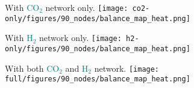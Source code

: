 \documentclass[12pt, aspectratio=169]{beamer}
\newcommand{\carbon}{\textcolor{teal}{CO$_2$}}
\newcommand{\hydrogen}{\textcolor{teal}{H$_2$}}
\begin{document}
\begin{frame}
    \begin{center}
    With \carbon{} network only.
    \texttt{[image: co2-only/figures/90\_nodes/balance\_map\_heat.png]}
    \end{center}
\end{frame}

\begin{frame}
    \begin{center}
    With \hydrogen{} network only.
    \texttt{[image: h2-only/figures/90\_nodes/balance\_map\_heat.png]}
    \end{center}
\end{frame}


\begin{frame}
    \begin{center}
    With both \carbon{}  and \hydrogen{} network.
    \texttt{[image: full/figures/90\_nodes/balance\_map\_heat.png]}
    \end{center}
\end{frame}
\end{document}

